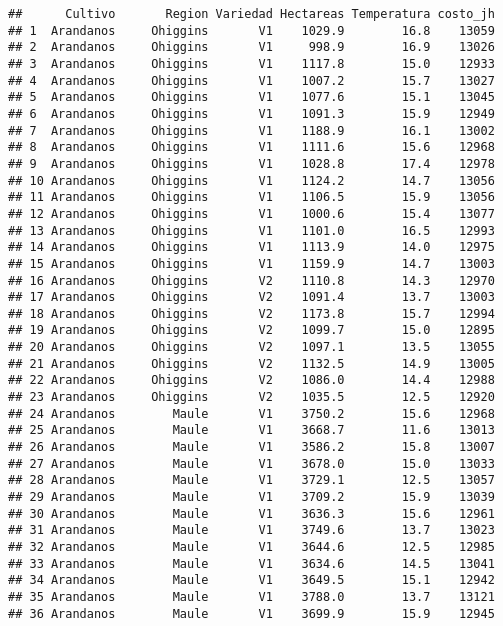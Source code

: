 \documentclass[]{book}
\begin{document}
\begin{verbatim}
##      Cultivo       Region Variedad Hectareas Temperatura costo_jh
## 1  Arandanos     Ohiggins       V1    1029.9        16.8    13059
## 2  Arandanos     Ohiggins       V1     998.9        16.9    13026
## 3  Arandanos     Ohiggins       V1    1117.8        15.0    12933
## 4  Arandanos     Ohiggins       V1    1007.2        15.7    13027
## 5  Arandanos     Ohiggins       V1    1077.6        15.1    13045
## 6  Arandanos     Ohiggins       V1    1091.3        15.9    12949
## 7  Arandanos     Ohiggins       V1    1188.9        16.1    13002
## 8  Arandanos     Ohiggins       V1    1111.6        15.6    12968
## 9  Arandanos     Ohiggins       V1    1028.8        17.4    12978
## 10 Arandanos     Ohiggins       V1    1124.2        14.7    13056
## 11 Arandanos     Ohiggins       V1    1106.5        15.9    13056
## 12 Arandanos     Ohiggins       V1    1000.6        15.4    13077
## 13 Arandanos     Ohiggins       V1    1101.0        16.5    12993
## 14 Arandanos     Ohiggins       V1    1113.9        14.0    12975
## 15 Arandanos     Ohiggins       V1    1159.9        14.7    13003
## 16 Arandanos     Ohiggins       V2    1110.8        14.3    12970
## 17 Arandanos     Ohiggins       V2    1091.4        13.7    13003
## 18 Arandanos     Ohiggins       V2    1173.8        15.7    12994
## 19 Arandanos     Ohiggins       V2    1099.7        15.0    12895
## 20 Arandanos     Ohiggins       V2    1097.1        13.5    13055
## 21 Arandanos     Ohiggins       V2    1132.5        14.9    13005
## 22 Arandanos     Ohiggins       V2    1086.0        14.4    12988
## 23 Arandanos     Ohiggins       V2    1035.5        12.5    12920
## 24 Arandanos        Maule       V1    3750.2        15.6    12968
## 25 Arandanos        Maule       V1    3668.7        11.6    13013
## 26 Arandanos        Maule       V1    3586.2        15.8    13007
## 27 Arandanos        Maule       V1    3678.0        15.0    13033
## 28 Arandanos        Maule       V1    3729.1        12.5    13057
## 29 Arandanos        Maule       V1    3709.2        15.9    13039
## 30 Arandanos        Maule       V1    3636.3        15.6    12961
## 31 Arandanos        Maule       V1    3749.6        13.7    13023
## 32 Arandanos        Maule       V1    3644.6        12.5    12985
## 33 Arandanos        Maule       V1    3634.6        14.5    13041
## 34 Arandanos        Maule       V1    3649.5        15.1    12942
## 35 Arandanos        Maule       V1    3788.0        13.7    13121
## 36 Arandanos        Maule       V1    3699.9        15.9    12945

\end{verbatim}
\end{document}

